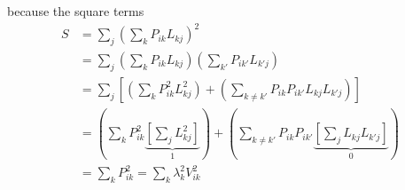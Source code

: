 \documentclass[10pt,a4paper]{article}
\begin{document}
because the square terms
\begin{align}
S &= \sum_j\left(\sum_k P_{ik}L_{kj}\right)^2 \\
&=  \sum_j \left(\sum_k P_{ik}L_{kj}\right)\left(\sum_{k'} P_{ik'}L_{k'j}\right)\\
&= \sum_j \left[\left(\sum_k P_{ik}^2L_{kj}^2\right) + \left(\sum_{k \neq k'} P_{ik} P_{ik'} L_{kj}L_{k'j}\right)\right]\\
&= \left(\sum_k P_{ik}^2 \underbrace{\left[ \sum_j L_{kj}^2\right]}_1 \right) + \left(\sum_{k \neq k'} P_{ik} P_{ik'} \underbrace{\left[ \sum_j L_{kj}L_{k'j} \right]}_0\right)\\
&= \sum_k P_{ik}^2 = \sum_k \lambda_k^2 V_{ik}^2
\end{align}



\end{document}
